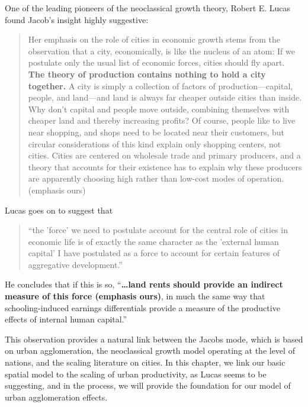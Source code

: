 One of the leading pioneers of the neoclassical growth theory, Robert E. Lucas \cite{lucasMechanicsEconomicDevelopment1988} found Jacob's insight highly suggestive:

\begin{quotation}
    Her emphasis on the role of cities in economic growth stems from the observation that a city, economically, is like the nucleus of an atom: If we postulate only the usual list of economic forces, cities should fly apart. \textbf{The theory of production contains nothing to hold a city together.} A city is simply a collection of factors of production---capital, people, and land---and land is always far cheaper outside cities than inside. Why don't capital and people move outside, combining themselves with cheaper land and thereby increasing profits? Of course, people like to live near shopping, and shops need to be located near their customers, but circular considerations of this kind explain only shopping centers, not cities. Cities are centered on wholesale trade and primary producers, and a theory that accounts for their existence has to explain why these producers are apparently choosing high rather than low-cost modes of operation. (emphasis ours)
\end{quotation}

Lucas goes on to suggest that \begin{quotation}``the 'force' we need to postulate account for the central role of cities in economic life is of exactly the same character as the 'external human capital' I have postulated as a force to account for certain features of aggregative development.''\end{quotation}  He concludes that if this is so, ``\textbf{\dots land rents should provide an indirect measure of this force (emphasis  ours)}, in much the same way that schooling-induced earnings differentials provide a measure of the productive effects of internal human capital.''


This observation provides a natural link between the Jacobs mode, which is based on urban agglomeration, the neoclassical growth model operating at the level of nations, and the scaling literature on cities. In this chapter, we link our basic spatial model to the scaling of urban productivity,  as Lucas seems to be suggesting, and in the process,  we will provide the foundation for our model of urban agglomeration effects.

